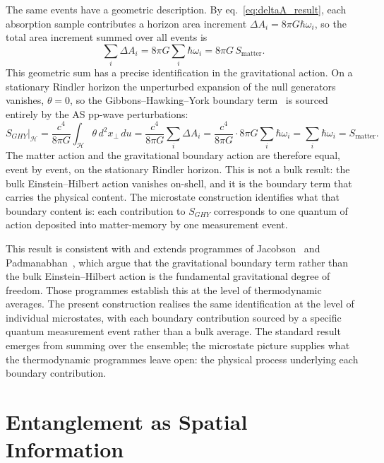 \documentclass[12pt,a4paper]{article}
\begin{document}
The same events have a geometric description. By 
eq.~\eqref{eq:deltaA_result}, each absorption sample contributes 
a horizon area increment $\Delta A_i = 8\pi G\hbar\omega_i$, so 
the total area increment summed over all events is
%
\begin{equation}
\sum_i \Delta A_i = 8\pi G \sum_i \hbar\omega_i = 8\pi G\, 
S_{\text{matter}}.
\end{equation}
%
This geometric sum has a precise identification in the 
gravitational action. On a stationary Rindler horizon the 
unperturbed expansion of the null generators vanishes, $\theta = 
0$, so the Gibbons--Hawking--York boundary 
term~\cite{gibbons1977action} is sourced entirely by the AS 
pp-wave perturbations:
%
\begin{equation}
S_{GHY}\big|_{\mathcal{H}} 
= \frac{c^4}{8\pi G}\int_{\mathcal{H}} \theta\, d^2x_\perp\, du 
= \frac{c^4}{8\pi G}\sum_i \Delta A_i 
= \frac{c^4}{8\pi G} \cdot 8\pi G\sum_i \hbar\omega_i 
= \sum_i \hbar\omega_i
= S_{\text{matter}}.
\label{eq:GHY_micro}
\end{equation}
%
The matter action and the gravitational boundary action are 
therefore equal, event by event, on the stationary Rindler 
horizon. This is not a bulk result: the bulk Einstein--Hilbert 
action vanishes on-shell, and it is the boundary term that 
carries the physical content. The microstate construction 
identifies what that boundary content is: each contribution to 
$S_{GHY}$ corresponds to one quantum of action deposited into 
matter-memory by one measurement event.

This result is consistent with and extends programmes of 
Jacobson~\cite{jacobson1995thermodynamics} and 
Padmanabhan~\cite{padmanabhan2010thermodynamical}, which argue 
that the gravitational boundary term rather than the bulk 
Einstein--Hilbert action is the fundamental gravitational degree 
of freedom. Those programmes establish this at the level of 
thermodynamic averages. The present construction realises the 
same identification at the level of individual microstates, with 
each boundary contribution sourced by a specific quantum 
measurement event rather than a bulk average. The standard 
result emerges from summing over the ensemble; the microstate 
picture supplies what the thermodynamic programmes leave open: 
the physical process underlying each boundary contribution.

\section{Entanglement as Spatial Information}
\label{sec:erepr}
\end{document}
